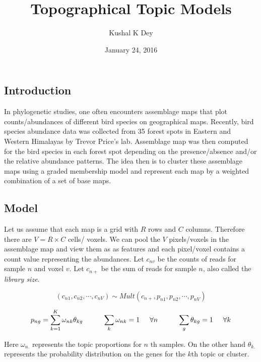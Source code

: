 \documentclass[]{article}
\title{Topographical Topic Models}
\author{Kushal K Dey}
\date{January 24, 2016}
\begin{document}
\maketitle


\subsection{Introduction}\label{introduction}

In phylogenetic studies, one often encounters assemblage maps that plot
counts/abundances of different bird species on geographical maps.
Recently, bird species abundance data was collected from 35 forest spots
in Eastern and Western Himalayas by Trevor Price's lab. Assemblage map
was then computed for the bird species in each forest spot depending on
the presence/absence and/or the relative abundance patterns. The idea
then is to cluster these assemblage maps using a graded membership model
and represent each map by a weighted combination of a set of base maps.

\subsection{Model}\label{model}

Let us assume that each map is a grid with \(R\) rows and \(C\) columns.
Therefore there are \(V = R \times C\) cells/ voxels. We can pool the
\(V\) pixels/voxels in the assemblage map and view them as as features
and each pixel/voxel contains a count value representing the abundances.
Let \(c_{nv}\) be the counts of reads for sample \(n\) and voxel \(v\).
Let \(c_{n+}\) be the sum of reads for sample \(n\), also called the
\emph{library size}.

\[ (c_{n1}, c_{n2}, \cdots, c_{nV}) \sim Mult (c_{n+}, p_{n1}, p_{n2}, \cdots, p_{nV})  \]

\[ p_{ng} = \sum_{k=1}^{K} \omega_{nk} \theta_{kg} \hspace{1 cm} \sum_{k} \omega_{nk} =1 \hspace{0.5 cm} \forall n \hspace{1 cm} \sum_{g} \theta_{kg} =1 \hspace{0.5 cm} \forall k\]

Here \(\omega_{n.}\) represents the topic proportions for \(n\) th
samples. On the other hand \(\theta_{k.}\) represents the probability
distribution on the genes for the \(k\)th topic or cluster.
\end{document}
